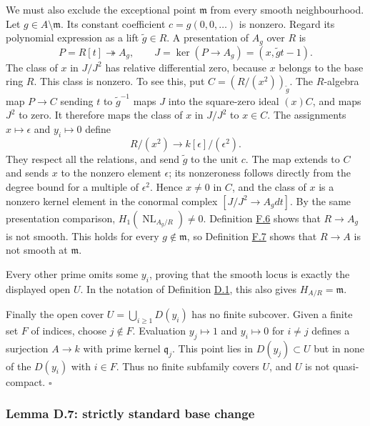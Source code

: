 \documentclass[11pt,a4paper,openany]{report}
\newcounter{none}
\begin{document}
We must also exclude the exceptional point \(\mathfrak m\) from every smooth neighbourhood. Let \(g\in A\setminus\mathfrak m\). Its constant coefficient \(c=g(0,0,\ldots)\) is nonzero. Regard its polynomial expression as a lift \(\widetilde g\in R\). A presentation of \(A_g\) over \(R\) is \[
P=R[t]\twoheadrightarrow A_g,\qquad
J=\ker(P\to A_g)=(x,\widetilde g t-1).
\] The class of \(x\) in \(J/J^2\) has relative differential zero, because \(x\) belongs to the base ring \(R\). This class is nonzero. To see this, put \(C=(R/(x^2))_{\widetilde g}\). The \(R\)-algebra map \(P\to C\) sending \(t\) to \(\widetilde g^{-1}\) maps \(J\) into the square-zero ideal \((x)C\), and maps \(J^2\) to zero. It therefore maps the class of \(x\) in \(J/J^2\) to \(x\in C\). The assignments \(x\mapsto\epsilon\) and \(y_i\mapsto0\) define \[
R/(x^2)\longrightarrow k[\epsilon]/(\epsilon^2).
\] They respect all the relations, and send \(\widetilde g\) to the unit \(c\). The map extends to \(C\) and sends \(x\) to the nonzero element \(\epsilon\); its nonzeroness follows directly from the degree bound for a multiple of \(\epsilon^2\). Hence \(x\ne0\) in \(C\), and the class of \(x\) is a nonzero kernel element in the conormal complex \([J/J^2\to A_gdt]\). By the same presentation comparison, \(H_1(\operatorname{NL}_{A_g/R})\ne0\). Definition \hyperref[AG-RG-S05-algebra-definition-smooth]{F.6} shows that \(R\to A_g\) is not smooth. This holds for every \(g\notin\mathfrak m\), so Definition \hyperref[AG-RG-S05-algebra-definition-smooth-at-prime]{F.7} shows that \(R\to A\) is not smooth at \(\mathfrak m\).

Every other prime omits some \(y_i\), proving that the smooth locus is exactly the displayed open \(U\). In the notation of Definition \hyperref[AG-RG-S05-smoothing-definition-singular-ideal]{D.1}, this also gives \(H_{A/R}=\mathfrak m\).

Finally the open cover \(U=\bigcup_{i\geq1}D(y_i)\) has no finite subcover. Given a finite set \(F\) of indices, choose \(j\notin F\). Evaluation \(y_j\mapsto1\) and \(y_i\mapsto0\) for \(i\ne j\) defines a surjection \(A\to k\) with prime kernel \(\mathfrak q_j\). This point lies in \(D(y_j)\subset U\) but in none of the \(D(y_i)\) with \(i\in F\). Thus no finite subfamily covers \(U\), and \(U\) is not quasi-compact. \(\square\)

\label{AG-RG-S05-smoothing-lemma-strictly-standard-base-change}

\subsubsection{Lemma D.7: strictly standard base change}\label{AG-RG-S05-lemma-d.7-strictly-standard-base-change}
\end{document}

